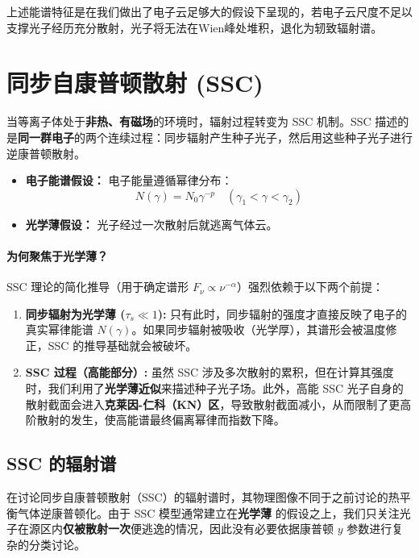 上述能谱特征是在我们做出了电子云足够大的假设下呈现的，若电子云尺度不足以支撑光子经历充分散射，光子将无法在Wien峰处堆积，退化为轫致辐射谱。
\section{同步自康普顿散射 (SSC)}

当等离子体处于\textbf{非热、有磁场}的环境时，辐射过程转变为 SSC 机制。SSC 描述的是\textbf{同一群电子}的两个连续过程：同步辐射产生种子光子，然后用这些种子光子进行逆康普顿散射。

\begin{itemize}
    \item \textbf{电子能谱假设：} 电子能量遵循幂律分布：
    \begin{equation}
        N(\gamma) = N_0 \gamma^{-p} \quad (\gamma_1 < \gamma < \gamma_2)
    \end{equation}
    \item \textbf{光学薄假设：} 光子经过一次散射后就逃离气体云。
\end{itemize}

\paragraph{为何聚焦于光学薄？}
SSC 理论的简化推导（用于确定谱形 $F_\nu \propto \nu^{-\alpha}$）强烈依赖于以下两个前提：
\begin{enumerate}
    \item \textbf{同步辐射为光学薄 ($\tau_s \ll 1$):} 只有此时，同步辐射的强度才直接反映了电子的真实幂律能谱 $N(\gamma)$。如果同步辐射被吸收（光学厚），其谱形会被温度修正，SSC 的推导基础就会被破坏。
    \item \textbf{SSC 过程（高能部分）:} 虽然 SSC 涉及多次散射的累积，但在计算其强度时，我们利用了\textbf{光学薄近似}来描述种子光子场。此外，高能 SSC 光子自身的散射截面会进入\textbf{克莱因-仁科（KN）区}，导致散射截面减小，从而限制了更高阶散射的发生，使高能谱最终偏离幂律而指数下降。
\end{enumerate}

\subsection{SSC 的辐射谱}

在讨论同步自康普顿散射（SSC）的辐射谱时，其物理图像不同于之前讨论的热平衡气体逆康普顿化。由于 SSC 模型通常建立在\textbf{光学薄} 的假设之上，我们只关注光子在源区内\textbf{仅被散射一次}便逃逸的情况，因此没有必要依据康普顿 $y$ 参数进行复杂的分类讨论。

